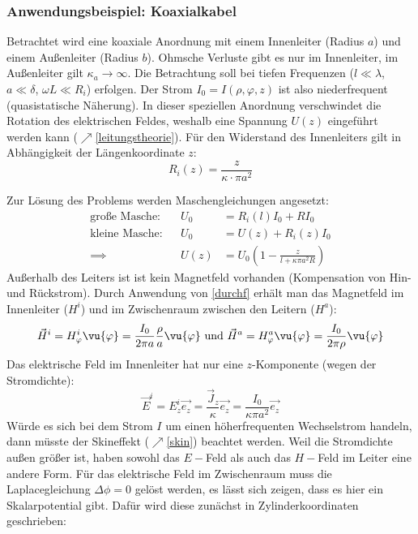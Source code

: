 		  \subsubsection{Anwendungsbeispiel: Koaxialkabel} 
		  Betrachtet wird eine koaxiale Anordnung mit einem Innenleiter (Radius $a$) und einem Außenleiter (Radius $b$). Ohmsche Verluste gibt es nur im Innenleiter, im Außenleiter gilt $\kappa_a\to\infty$. Die Betrachtung soll bei tiefen Frequenzen ($l\ll\lambda$, $a\ll\delta$, $\omega L \ll R_i$) erfolgen. Der Strom $I_0=I(\rho,\varphi,z)$ ist also niederfrequent (quasistatische Näherung). In dieser speziellen Anordnung verschwindet die Rotation des elektrischen Feldes, weshalb eine Spannung $U(z)$ eingeführt werden kann ($\nearrow$\ref{leitungstheorie}). Für den Widerstand des Innenleiters gilt in Abhängigkeit der Längenkoordinate $z$: 
		  \begin{equation*}
		  	R_i(z)=\frac{z}{\kappa\cdot \pi a^2}
		  \end{equation*}
		  \begin{center}
		  	\resizebox{\textwidth}{!}{}
		  \end{center}
		 Zur Lösung des Problems werden Maschengleichungen angesetzt:
		  	\begin{align*}
		  		\text{große Masche:}  &  & U_0  & = R_i(l)I_0 + RI_0                               \\
		  		\text{kleine Masche:} &  & U_0  & = U(z) + R_i(z)I_0                               \\
		  		\implies                   &  & U(z) & = U_0\left(1-\frac{z}{l+\kappa\pi a^2 R} \right)
		  	\end{align*}
		  Außerhalb des Leiters ist ist kein Magnetfeld vorhanden (Kompensation von Hin- und Rückstrom). Durch Anwendung von \ref{durchf} erhält man das Magnetfeld im Innenleiter ($H^i$) und im Zwischenraum zwischen den Leitern ($H^a$):
		  \begin{equation*}
		  	\vec{H} ^i = H_\varphi^i \vu{\varphi} = \frac{I_0}{2\pi a}\frac{\rho}{a} \vu{\varphi} \text{ und } \vec{H} ^a = H_\varphi^a \vu{\varphi} = \frac{I_0}{2\pi \rho} \vu{\varphi}
		  \end{equation*}
		  	Das elektrische Feld im Innenleiter hat nur eine $z$-Komponente (wegen der Stromdichte): $$\vec{E}^i=E_z^i \vec{e_z} = \frac{\vec{J}_z}{\kappa}\vec{e_z}=\frac{I_0}{\kappa\pi a^2}\vec{e_z}$$	Würde es sich bei dem Strom $I$ um einen höherfrequenten Wechselstrom handeln, dann müsste der Skineffekt ($\nearrow$\ref{skin}) beachtet werden. Weil die Stromdichte außen größer ist, haben sowohl das $E-$Feld als auch das $H-$Feld im Leiter eine andere Form. Für das elektrische Feld im Zwischenraum muss die Laplacegleichung $\Delta \phi =0$ gelöst werden, es lässt sich zeigen, dass es hier ein Skalarpotential gibt. Dafür wird diese zunächst in Zylinderkoordinaten geschrieben:
